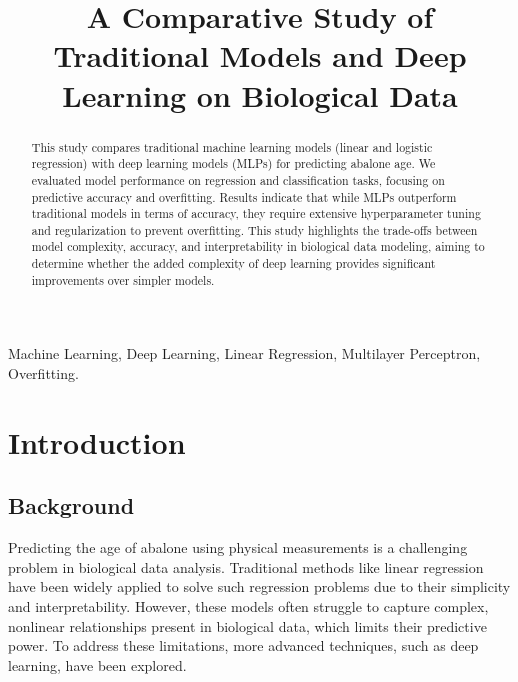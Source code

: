 \documentclass[conference]{IEEEtran}
\begin{document}
\title{A Comparative Study of Traditional Models and Deep Learning on Biological Data
}

\author{
\and
{}
\and
{}
}

\maketitle

\begin{abstract}
This study compares traditional machine learning models (linear and logistic regression) with deep learning models (MLPs) for predicting abalone age. We evaluated model performance on regression and classification tasks, focusing on predictive accuracy and overfitting. Results indicate that while MLPs outperform traditional models in terms of accuracy, they require extensive hyperparameter tuning and regularization to prevent overfitting. This study highlights the trade-offs between model complexity, accuracy, and interpretability in biological data modeling, aiming to determine whether the added complexity of deep learning provides significant improvements over simpler models.
\end{abstract}

\begin{IEEEkeywords}
Machine Learning, Deep Learning, Linear Regression, Multilayer Perceptron, Overfitting.
\end{IEEEkeywords}

\section{Introduction}

\subsection{Background}

Predicting the age of abalone using physical measurements is a challenging problem in biological data analysis. Traditional methods like linear regression have been widely applied to solve such regression problems due to their simplicity and interpretability. However, these models often struggle to capture complex, nonlinear relationships present in biological data, which limits their predictive power. To address these limitations, more advanced techniques, such as deep learning, have been explored.
\end{document}
